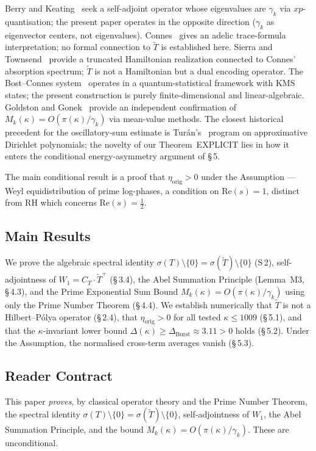 \documentclass[11pt]{article}
\newcommand{\etaorig}{\eta_{\mathrm{orig}}}
\newcommand{\Tt}{\widetilde{T}}
\newcommand{\CT}{C_{T}}
\newcommand{\Wone}{W_1}
\newcommand{\Dburstvar}{\Delta_{\mathrm{Burst}}}
\begin{document}
Berry and Keating~\cite{BerryKeating} seek a self-adjoint operator
whose eigenvalues are $\gamma_k$ via $xp$-quantisation; the present
paper operates in the opposite direction ($\gamma_k$ as eigenvector
centers, not eigenvalues). Connes~\cite{Connes} gives an adelic
trace-formula interpretation; no formal connection to $\Tt$ is
established here.
Sierra and Townsend~\cite{SierraTownsend} provide a truncated
Hamiltonian realization connected to Connes' absorption spectrum;
$\Tt$ is not a Hamiltonian but a dual encoding operator.
The Bost--Connes system~\cite{BostConnes} operates in a
quantum-statistical framework with KMS states; the present
construction is purely finite-dimensional and linear-algebraic.
Goldston and Gonek~\cite{GoldstonGonek} provide an independent
confirmation of $M_k(\kappa)=O(\pi(\kappa)/\gamma_k)$ via
mean-value methods. The closest historical precedent for the
oscillatory-sum estimate is Tur\'an's~\cite{Turan} program on
approximative Dirichlet polynomials; the novelty of our Theorem~EXPLICIT
lies in how it enters the conditional energy-asymmetry argument of \S\,5.

The main conditional result is a proof that $\etaorig > 0$ under
the Assumption --- Weyl equidistribution of prime log-phases,
a condition on $\mathrm{Re}(s)=1$, distinct from
RH which concerns $\mathrm{Re}(s)=\tfrac{1}{2}$.

\subsection{Main Results}

We prove the algebraic spectral identity
$\sigma(T)\setminus\{0\}=\sigma(\Tt)\setminus\{0\}$ (S\,2),
self-adjointness of $\Wone = \CT\cdot\Tt^+$ (\S\,3.4), the Abel
Summation Principle (Lemma~M3, \S\,4.3), and the Prime Exponential
Sum Bound $M_k(\kappa) = O(\pi(\kappa)/\gamma_k)$ using only the
Prime Number Theorem (\S\,4.4). We establish numerically that $\Tt$
is not a Hilbert--P\'olya operator (\S\,2.4), that $\etaorig > 0$
for all tested $\kappa\le 1009$ (\S\,5.1), and that the
$\kappa$-invariant lower bound $\Delta(\kappa)\ge\Dburstvar\approx
3.11 > 0$ holds (\S\,5.2). Under the Assumption, the normalised
cross-term averages vanish (\S\,5.3).

\subsection{Reader Contract}

This paper \emph{proves}, by classical operator theory and the Prime
Number Theorem, the spectral identity
$\sigma(T)\setminus\{0\}=\sigma(\Tt)\setminus\{0\}$,
self-adjointness of $\Wone$,
the Abel Summation Principle, and the bound
$M_k(\kappa) = O(\pi(\kappa)/\gamma_k)$.
These are unconditional.
\end{document}
